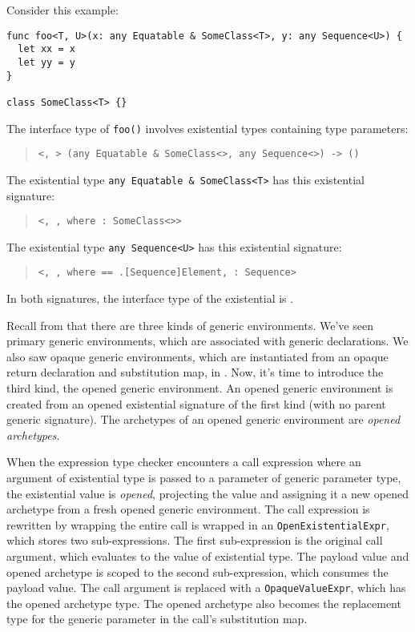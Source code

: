 \documentclass[../generics]{subfiles}
\begin{document}
\begin{example}
Consider this example:
\begin{Verbatim}
func foo<T, U>(x: any Equatable & SomeClass<T>, y: any Sequence<U>) {
  let xx = x
  let yy = y
}

class SomeClass<T> {}
\end{Verbatim}
The interface type of \texttt{foo()} involves existential types containing type parameters:
\begin{quote}
\texttt{<, > (any Equatable \& SomeClass<>, any Sequence<>) -> ()}
\end{quote}
The existential type \texttt{any Equatable \& SomeClass<T>} has this existential signature:
\begin{quote}
\texttt{<, ,  where :\ SomeClass<>>}
\end{quote}
The existential type \texttt{any Sequence<U>} has this existential signature:
\begin{quote}
\texttt{<, ,  where  == .[Sequence]Element, :\ Sequence>}
\end{quote}
In both signatures, the interface type of the existential is \texttt{}.
\end{example}
Recall from  that there are three kinds of generic environments. We've seen primary generic environments, which are associated with generic declarations. We also saw opaque generic environments, which are instantiated from an opaque return declaration and substitution map, in . Now, it's time to introduce the third kind, the opened generic environment. An opened generic environment is created from an opened existential signature of the first kind (with no parent generic signature). The archetypes of an opened generic environment are \emph{opened archetypes}.

When the expression type checker encounters a call expression where an argument of existential type is passed to a parameter of generic parameter type, the existential value is \emph{opened}, projecting the value and assigning it a new opened archetype from a fresh opened generic environment. The call expression is rewritten by wrapping the entire call is wrapped in an \texttt{OpenExistentialExpr}, which stores two sub-expressions. The first sub-expression is the original call argument, which evaluates to the value of existential type. The payload value and opened archetype is scoped to the second sub-expression, which consumes the payload value. The call argument is replaced with a \texttt{OpaqueValueExpr}, which has the opened archetype type. The opened archetype also becomes the replacement type for the generic parameter in the call's substitution map.
\end{document}
